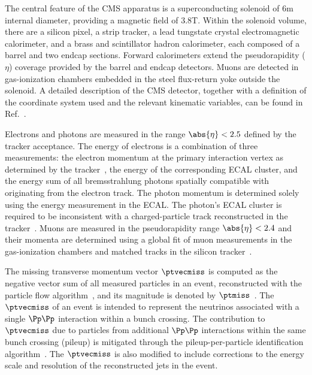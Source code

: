 \documentclass[11pt,twoside,a4paper,cmspaper]{cms-tdr}
\begin{document}
The central feature of the CMS apparatus is a superconducting solenoid of 6\unit{m} internal diameter, providing a magnetic field of 3.8\unit{T}. Within the solenoid volume, there are a silicon pixel, a strip tracker, a lead tungstate crystal electromagnetic calorimeter, and a brass and scintillator hadron calorimeter, each composed of a barrel and two endcap sections. Forward calorimeters extend the pseudorapidity ($\eta$) coverage provided by the barrel and endcap detectors. Muons are detected in gas-ionization chambers embedded in the steel flux-return yoke outside the solenoid. A detailed description of the CMS detector, together with a definition of the coordinate system used and the relevant kinematic variables, can be found in Ref.~\cite{Chatrchyan:2008zzk}.

Electrons and photons are measured in the range $\abs{\eta} < 2.5$ defined by the tracker acceptance. The energy of electrons is a combination of three measurements: the electron momentum at the primary interaction vertex as determined by the tracker~\cite{pvdefinition}, the energy of the corresponding ECAL cluster, and the energy sum of all bremsstrahlung photons spatially compatible with originating from the electron track. The photon momentum is determined solely using the energy measurement in the ECAL. The photon's ECAL cluster is required to be inconsistent with a charged-particle track reconstructed in the tracker~\cite{cmscollaboration2020electron}. Muons are measured in the pseudorapidity range $\abs{\eta} < 2.4$ and their momenta are determined using a global fit of muon measurements in the gas-ionization chambers and matched tracks in the silicon tracker~\cite{Sirunyan:2018}.

The missing transverse momentum vector $\ptvecmiss$ is computed as the negative vector \pt sum of all measured particles in an event, reconstructed with the particle flow algorithm~\cite{CMS-PRF-14-001}, and its magnitude is denoted by $\ptmiss$~\cite{Sirunyan_2019}. The $\ptvecmiss$ of an event is intended to represent the neutrinos associated with a single $\Pp \Pp$ interaction within a bunch crossing. The contribution to $\ptvecmiss$ due to particles from additional $\Pp \Pp$ interactions within the same bunch crossing (pileup) is mitigated through the pileup-per-particle identification algorithm~\cite{Bertolini:2014bba,cmspuppi}. The $\ptvecmiss$ is also modified to include corrections to the energy scale and resolution of the reconstructed jets in the event.
\end{document}
